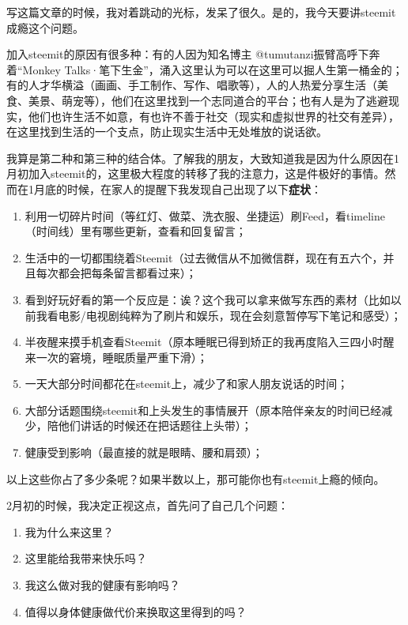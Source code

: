 \documentclass[]{ctexbook}
\begin{document}
写这篇文章的时候，我对着跳动的光标，发呆了很久。是的，我今天要讲steemit成瘾这个问题。

加入steemit的原因有很多种：有的人因为知名博主 @tumutanzi振臂高呼下奔着``Monkey Talks·笔下生金''，涌入这里认为可以在这里可以掘人生第一桶金的；有的人才华横溢（画画、手工制作、写作、唱歌等），人的人热爱分享生活（美食、美景、萌宠等），他们在这里找到一个志同道合的平台；也有人是为了逃避现实，他们也许生活不如意，有也许不善于社交（现实和虚拟世界的社交有差异），在这里找到生活的一个支点，防止现实生活中无处堆放的说话欲。

我算是第二种和第三种的结合体。了解我的朋友，大致知道我是因为什么原因在1月初加入steemit的，这里极大程度的转移了我的注意力，这是件极好的事情。然而在1月底的时候，在家人的提醒下我发现自己出现了以下\textbf{症状}：

\begin{enumerate}
\def\labelenumi{\arabic{enumi}.}
\item
  利用一切碎片时间（等红灯、做菜、洗衣服、坐捷运）刷Feed，看timeline（时间线）里有哪些更新，查看和回复留言；
\item
  生活中的一切都围绕着Steemit（过去微信从不加微信群，现在有五六个，并且每次都会把每条留言都看过来）；
\item
  看到好玩好看的第一个反应是：诶？这个我可以拿来做写东西的素材（比如以前我看电影/电视剧纯粹为了刷片和娱乐，现在会刻意暂停写下笔记和感受）；
\item
  半夜醒来摸手机查看Steemit（原本睡眠已得到矫正的我再度陷入三四小时醒来一次的窘境，睡眠质量严重下滑）；
\item
  一天大部分时间都花在steemit上，减少了和家人朋友说话的时间；
\item
  大部分话题围绕steemit和上头发生的事情展开（原本陪伴亲友的时间已经减少，陪他们讲话的时候还在把话题往上头带）；
\item
  健康受到影响（最直接的就是眼睛、腰和肩颈）；
\end{enumerate}

以上这些你占了多少条呢？如果半数以上，那可能你也有steemit上瘾的倾向。

2月初的时候，我决定正视这点，首先问了自己几个问题：

\begin{enumerate}
\def\labelenumi{\arabic{enumi}.}
\item
  我为什么来这里？
\item
  这里能给我带来快乐吗？
\item
  我这么做对我的健康有影响吗？
\item
  值得以身体健康做代价来换取这里得到的吗？
\end{enumerate}
\end{document}
